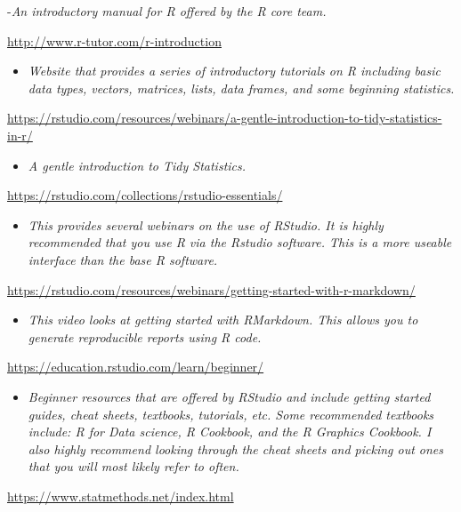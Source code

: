 \documentclass[
]{book}
\providecommand{\tightlist}{%
  \setlength{\itemsep}{0pt}\setlength{\parskip}{0pt}}
\begin{document}
-\emph{An introductory manual for R offered by the R core team.}

\url{http://www.r-tutor.com/r-introduction}

\begin{itemize}
\tightlist
\item
  \emph{Website that provides a series of introductory tutorials on R including basic data types, vectors, matrices, lists, data frames, and some beginning statistics.}
\end{itemize}

\url{https://rstudio.com/resources/webinars/a-gentle-introduction-to-tidy-statistics-in-r/}

\begin{itemize}
\tightlist
\item
  \emph{A gentle introduction to Tidy Statistics.}
\end{itemize}

\url{https://rstudio.com/collections/rstudio-essentials/}

\begin{itemize}
\tightlist
\item
  \emph{This provides several webinars on the use of RStudio. It is highly recommended that you use R via the Rstudio software. This is a more useable interface than the base R software.}
\end{itemize}

\url{https://rstudio.com/resources/webinars/getting-started-with-r-markdown/}

\begin{itemize}
\tightlist
\item
  \emph{This video looks at getting started with RMarkdown. This allows you to generate reproducible reports using R code.}
\end{itemize}

\url{https://education.rstudio.com/learn/beginner/}

\begin{itemize}
\tightlist
\item
  \emph{Beginner resources that are offered by RStudio and include getting started guides, cheat sheets, textbooks, tutorials, etc. Some recommended textbooks include: R for Data science, R Cookbook, and the R Graphics Cookbook. I also highly recommend looking through the cheat sheets and picking out ones that you will most likely refer to often.}
\end{itemize}

\url{https://www.statmethods.net/index.html}
\end{document}
